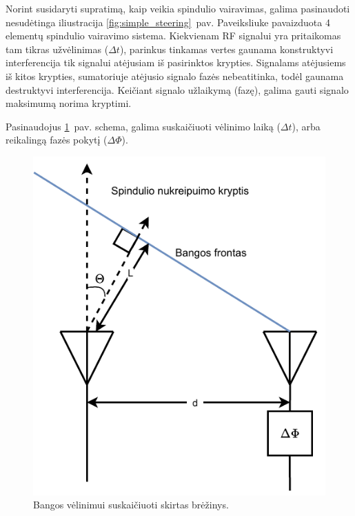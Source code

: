 \documentclass[main.tex]{subfiles}
\begin{document}
Norint susidaryti supratimą, kaip veikia spindulio vairavimas, galima
pasinaudoti nesudėtinga iliustracija \ref{fig:simple_steering}~pav.
Paveiksliuke pavaizduota 4 elementų spindulio vairavimo sistema. Kiekvienam
RF signalui yra pritaikomas tam tikras užvėlinimas ($\Delta t$), parinkus
tinkamas vertes gaunama konstruktyvi interferencija tik signalui atėjusiam
iš pasirinktos krypties. Signalams atėjusiems iš kitos krypties, sumatoriuje
atėjusio signalo fazės nebeatitinka, todėl gaunama destruktyvi interferencija.
Keičiant signalo užlaikymą (fazę), galima gauti signalo maksimumą norima
kryptimi.

Pasinaudojus \ref{fig:beamform_path}~pav. schema, galima suskaičiuoti vėlinimo laiką ($\Delta t$), arba reikalingą
fazės pokytį ($\Delta\Phi$).

\begin{figure}[h]
    \begin{centering}
    \includegraphics[scale=0.8]{drawings/beamform_path}
    \par\end{centering}
    \protect\caption{\label{fig:beamform_path}Bangos vėlinimui suskaičiuoti skirtas brėžinys.}
\end{figure}
\end{document}
